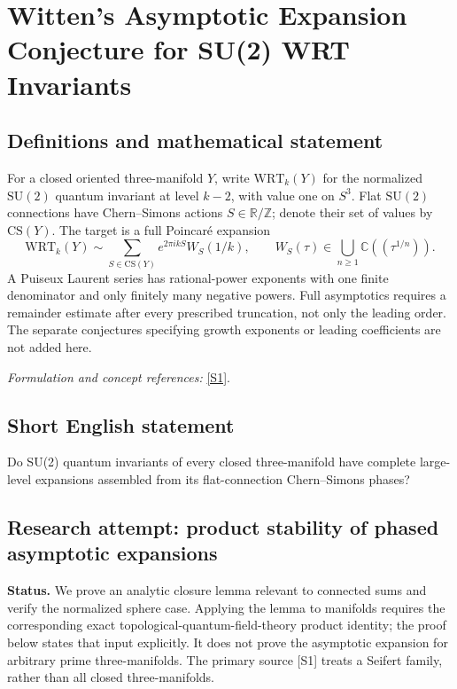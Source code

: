 \documentclass[11pt]{article}
\begin{document}
\section*{\texorpdfstring{Witten's Asymptotic Expansion Conjecture for SU(2) WRT Invariants}{Witten's Asymptotic Expansion Conjecture for SU(2) WRT Invariants}}\label{30006807}
\subsection{Definitions and mathematical statement}
For a closed oriented three-manifold $Y$, write $\mathrm{WRT}_k(Y)$ for the normalized $\mathrm{SU}(2)$ quantum invariant at level $k-2$, with value one on $S^3$. Flat $\mathrm{SU}(2)$ connections have Chern--Simons actions $S\in{\mathbb{R}}/{\mathbb{Z}}$; denote their set of values by $\mathrm{CS}(Y)$. The target is a full Poincar\'e expansion
\[
 \mathrm{WRT}_k(Y)\sim\sum_{S\in\mathrm{CS}(Y)}e^{2\pi i kS}W_S(1/k),
 \qquad W_S(\tau)\in\bigcup_{n\ge1}{\mathbb{C}}((\tau^{1/n})).
\]
A Puiseux Laurent series has rational-power exponents with one finite denominator and only finitely many negative powers. Full asymptotics requires a remainder estimate after every prescribed truncation, not only the leading order. The separate conjectures specifying growth exponents or leading coefficients are not added here.
\par\smallskip\textit{Formulation and concept references:} \href{https://arxiv.org/html/2510.10678v1}{[S1]}.

\subsection{Short English statement}
Do SU(2) quantum invariants of every closed three-manifold have complete large-level expansions assembled from its flat-connection Chern–Simons phases?
\subsection{Research attempt: product stability of phased asymptotic expansions}
\textbf{Status.} We prove an analytic closure lemma relevant to connected sums and verify the normalized sphere case. Applying the lemma to manifolds requires the corresponding exact topological-quantum-field-theory product identity; the proof below states that input explicitly. It does not prove the asymptotic expansion for arbitrary prime three-manifolds. The primary source [S1] treats a Seifert family, rather than all closed three-manifolds.
\end{document}
